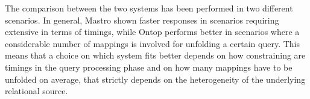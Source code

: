 The comparison between the two systems has been performed in two different scenarios. In general, Mastro shown faster responses in scenarios requiring extensive in terms of timings, while Ontop performs better in scenarios where a considerable number of mappings is involved for unfolding a certain query.
This means that a choice on which system fits better depends on how constraining are timings in the query processing phase and on how many mappings have to be unfolded on average, that strictly depends on the heterogeneity of the underlying relational source.

